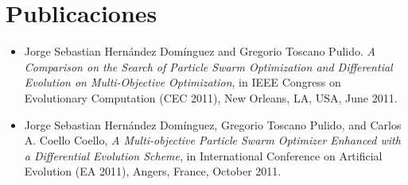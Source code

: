 \chapter{Publicaciones}
\begin{itemize}
\item Jorge Sebastian Hernández Domínguez and Gregorio Toscano Pulido. \emph{A Comparison on the Search of Particle Swarm Optimization and Differential Evolution on Multi-Objective Optimization}, in IEEE Congress on Evolutionary Computation (CEC 2011), New Orleans, LA, USA, June 2011.
\item 
Jorge Sebastian Hernández Domínguez, Gregorio Toscano Pulido, and Carlos A. Coello Coello, \emph{A Multi-objective Particle Swarm Optimizer Enhanced with a Differential Evolution Scheme}, in International Conference on Artificial Evolution (EA 2011), Angers, France, October 2011.

\end{itemize}


